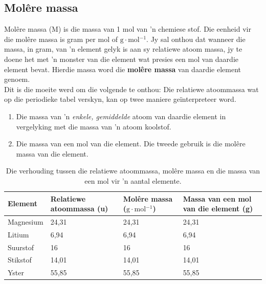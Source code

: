             \subsection*{Mol\^{e}re massa}
            \nopagebreak
{} { Mol\^{e}re massa (M) is die massa van 1 mol van 'n chemiese stof. Die eenheid vir die mol\^{e}re massa is gram per mol of $\text{g}\ensuremath{\cdot}\text{mol}{}^{-1}$. } 
Jy sal onthou dat wanneer die massa, in gram, van 'n element gelyk is aan sy relatiewe atoom massa, jy te doene het met  'n monster van die element wat presies een mol van daardie element bevat. Hierdie massa word die \textbf{mol\^{e}re massa} van daardie element genoem.\\
\label{m38717*id276445}Dit is die moeite werd om die volgende te onthou: Die relatiewe atoommassa wat op die periodieke tabel verskyn, kan op twee maniere geïnterpreteer word.
\begin{enumerate}[noitemsep, label=\textbf{\arabic*}. ] 
\item Die massa van 'n \textsl{enkele, gemiddelde} atoom van daardie element in vergelyking met die massa van 'n atoom koolstof.
\item Die massa van een mol van die element. Die tweede gebruik is die mol\^{e}re massa van die element.
\end{enumerate}
          \begin{table}[H]
        \begin{center}
      \label{m38717*uid11}
    \noindent
      \begin{tabular}{|l|l|l|p{3cm}|}\hline
                \textbf{Element}
               &
                \textbf{Relatiewe atoommassa (u)}
               &
                \textbf{Mol\^{e}re massa ($\text{g}\ensuremath{\cdot}\text{mol}{}^{-1}$)}
               &
                \textbf{Massa van een mol van die element (g)} \\ \hline
        Magnesium &
        24,31 &
        24,31 &
        24,31 \\ \hline
        Litium &
        6,94 &
        6,94 &
        6,94 \\ \hline
        Suurstof &
        16 &
        16 &
        16 \\ \hline
        Stikstof &
        14,01 &
        14,01 &
        14,01  \\ \hline
        Yster &
        55,85 &
        55,85 &
        55,85 \\ \hline
    \end{tabular}
      \end{center}
    \caption{Die verhouding tussen die relatiewe atoommassa, mol\^{e}re massa en die massa van een mol vir 'n aantal elemente.}
\end{table}


